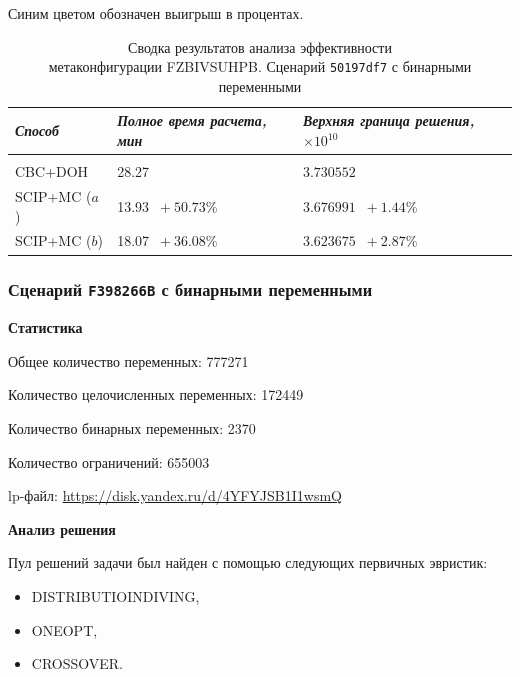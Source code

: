 \documentclass[%
	11pt,
	a4paper,
	utf8,
		]{article}
\begin{document}
Синим цветом обозначен выигрыш в процентах.

{
	\begin{table}[!h]
		\centering
		\caption{Сводка результатов анализа эффективности\\метаконфигурации FZBIVSUHPB. Сценарий \texttt{50197df7} с бинарными переменными}
		\begin{tabular}{ p{2.5cm} p{3.3cm} p{3.4cm} }
			\emph{Способ} & \emph{Полное время расчета, мин} & \emph{Верхняя граница решения, $ \times 10^{10} $} \\
			\hline\hline\\[-3.5mm]
			{CBC+DOH} & 28.27 & $ 3.730552 $ \\
			\hline
			SCIP+MC ($ a $) & 13.93 {\color{blue} $\ +50.73 $\%} & $ 3.676991 $ {\color{blue} $\ +1.44 $\%} \\
			\hline
			SCIP+MC ($ b $) & 18.07 {\color{blue} $\ +36.08 $\%} & $ 3.623675 $ {\color{blue} $\ +2.87 $\%} \\
		\end{tabular}\label{tab:50197df7}
	\end{table}
}

\subsubsection{Сценарий \texttt{F398266B} с бинарными переменными}\label{sec:f398266b_bin}

\textbf{Статистика}\vspace*{1mm}

Общее количество переменных: 777271

Количество целочисленных переменных: 172449

Количество бинарных переменных: 2370

Количество ограничений: 655003

lp-файл: \url{https://disk.yandex.ru/d/4YFYJSB1I1wsmQ} 

\vspace*{5mm}\textbf{Анализ решения}\vspace*{1mm}

Пул решений задачи был найден с помощью следующих первичных эвристик:
\begin{itemize}
	\item DISTRIBUTIOINDIVING,
	
	\item ONEOPT,
	
	\item CROSSOVER.
\end{itemize}
\end{document}
